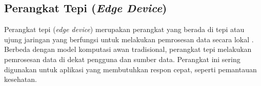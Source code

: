 \subsection{Perangkat Tepi (\emph{Edge Device})}
\label{subsec: landasan-edge-device}
%
%
Perangkat tepi (\emph{edge device}) merupakan perangkat yang berada di tepi atau
ujung jaringan yang berfungsi untuk melakukan pemrosesan data secara lokal \parencite{khouasTrainingMachineLearning2024}.
Berbeda dengan model komputasi awan tradisional, perangkat tepi melakukan pemrosesan data di dekat pengguna dan sumber data.
Perangkat ini sering digunakan untuk aplikasi yang membutuhkan respon cepat, seperti pemantauan kesehatan.

